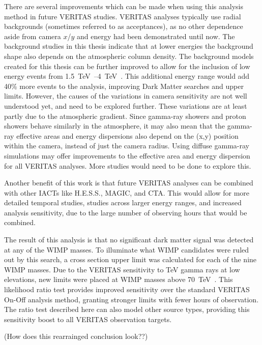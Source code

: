 There are several improvements which can be made when using this analysis method in future VERITAS studies.
VERITAS analyses typically use radial backgrounds (sometimes referred to as acceptances), as no other dependence aside from camera $x$/$y$ and energy had been demonstrated until now.
The background studies in this thesis indicate that at lower energies the background shape also depends on the atmospheric column density.
The background models created for this thesis can be further improved to allow for the inclusion of low energy events from \SIrange{1.5}{4}{\TeV{}}.
This additional energy range would add \nicetilde{}40\% more events to the analysis, improving Dark Matter searches and upper limits.
However, the causes of the variations in camera sensitivity are not well understood yet, and need to be explored further.
These variations are at least partly due to the atmospheric gradient.
Since gamma-ray showers and proton showers behave similarly in the atmosphere, it may also mean that the gamma-ray effective areas and energy dispersions also depend on the (x,y) position within the camera, instead of just the camera radius.
Using diffuse gamma-ray simulations may offer improvements to the effective area and energy dispersion for all VERITAS analyses.
More studies would need to be done to explore this.

Another benefit of this work is that future VERITAS analyses can be combined with other IACTs like H.E.S.S., MAGIC, and CTA.
This would allow for more detailed temporal studies, studies across larger energy ranges, and increased analysis sensitivity, due to the large number of observing hours that would be combined.

The result of this analysis is that no significant dark matter signal was detected at any of the WIMP masses.
To illuminate what WIMP candidates were ruled out by this search, a cross section upper limit was calculated for each of the nine WIMP masses.
Due to the VERITAS sensitivity to TeV gamma rays at low elevations, new limits were placed at WIMP masses above \SI{70}{\TeV{}}.
This likelihood ratio test provides improved sensitivity over the standard VERITAS On-Off analysis method, granting stronger limits with fewer hours of observation.
The ratio test described here can also model other source types, providing this sensitivity boost to all VERITAS observation targets.

{\color{red}(How does this rearrainged conclusion look??)}
